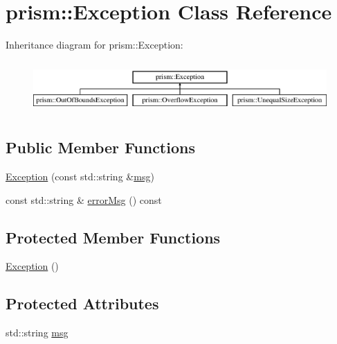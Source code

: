 \hypertarget{classprism_1_1_exception}{}\section{prism\+:\+:Exception Class Reference}
\label{classprism_1_1_exception}
Inheritance diagram for prism\+:\+:Exception\+:\begin{figure}[H]
\begin{center}
\leavevmode
\includegraphics[height=1.996435cm]{classprism_1_1_exception}
\end{center}
\end{figure}
\subsection*{Public Member Functions}
\begin{DoxyCompactItemize}
\item 
\hyperlink{classprism_1_1_exception_ae878686fee2f57a9461a306a6a1e0fe7}{Exception} (const std\+::string \&\hyperlink{classprism_1_1_exception_ab768e96bc8a3f617b3420e19a18caf9f}{msg})
\item 
const std\+::string \& \hyperlink{classprism_1_1_exception_aba1bf849ad38dd259361be85672fc309}{error\+Msg} () const 
\end{DoxyCompactItemize}
\subsection*{Protected Member Functions}
\begin{DoxyCompactItemize}
\item 
\hyperlink{classprism_1_1_exception_aa99b00004a3c6643adbcf7c7575fd0ce}{Exception} ()
\end{DoxyCompactItemize}
\subsection*{Protected Attributes}
\begin{DoxyCompactItemize}
\item 
std\+::string \hyperlink{classprism_1_1_exception_ab768e96bc8a3f617b3420e19a18caf9f}{msg}
\end{DoxyCompactItemize}



